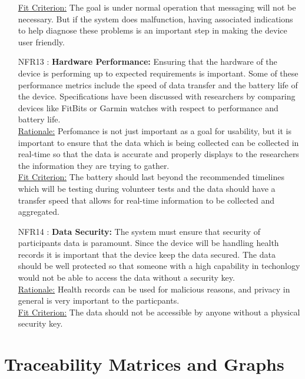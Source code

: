 \documentclass[12pt]{article}
\begin{document}
\begin{itemize}
\underline{Fit Criterion:} The goal is under normal operation that messaging will not be necessary. But if the system does malfunction, having associated indications to help diagnose these problems is an important step in making the device user friendly.\\


\item[NFR13 \label{NFR13}:]
  \textbf{Hardware Performance:} Ensuring that the hardware of the device is performing up to expected requirements is important. Some of these performance metrics include the speed of data transfer and the battery life of the device. Specifications have been discussed with researchers by comparing devices like FitBits or Garmin watches with respect to performance and battery life.\\

\underline{Rationale:} Perfomance is not just important as a goal for usability, but it is important to ensure that the data which is being collected can be collected in real-time so that the data is accurate and properly displays to the researchers the information they are trying to gather.\\

\underline{Fit Criterion:} The battery should last beyond the recommended timelines which will be testing during volunteer tests and the data should have a transfer speed that allows for real-time information to be collected and aggregated.\\


\item[NFR14 \label{NFR14}:]
  \textbf{Data Security:} The system must ensure that security of participants data is paramount. Since the device will be handling health records it is important that the device keep the data secured. The data should be well protected so that someone with a high capability in techonlogy would not be able to access the data without a security key.\\

\underline{Rationale:} Health records can be used for malicious reasons, and privacy in general is very important to the particpants.\\

\underline{Fit Criterion:} The data should not be accessible by anyone without a physical security key.\\


\end{itemize}

\section{Traceability Matrices and Graphs}
\end{document}

